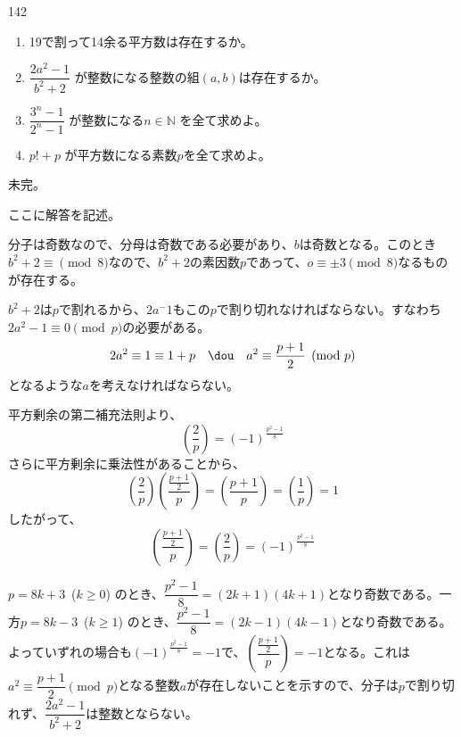 \begin{prob}{142}{}{}
 \begin{enumerate}
  \item 19で割って14余る平方数は存在するか。 
  \item $\dfrac{2a^2-1}{b^2+2}$ が整数になる整数の組$(a,b)$は存在するか。 
  \item $\dfrac{3^n-1}{2^n-1}$ が整数になる$n\in\mathbb{N}$ を全て求めよ。 
  \item $p!+p$ が平方数になる素数$p$を全て求めよ。 
 \end{enumerate}
\end{prob}
未完。

ここに解答を記述。

分子は奇数なので、分母は奇数である必要があり、$b$は奇数となる。このとき$b^2+2\equiv\pmod{8}$なので、$b^2+2$の素因数$p$であって、$o\equiv\pm 3 \pmod{8}$なるものが存在する。

$b^2+2$は$p$で割れるから、$2a^-1$もこの$p$で割り切れなければならない。すなわち$2a^2-1\equiv 0\pmod{p}$の必要がある。
\[ 2a^2\equiv 1\equiv 1+p \quad\dou\quad a^2\equiv \frac{p+1}{2} \pmod{p} \]
となるような$a$を考えなければならない。

平方剰余の第二補充法則より、
\[ \left(\frac{2}{p}\right)=\left(-1\right)^{\frac{p^2-1}{8}} \]
さらに平方剰余に乗法性があることから、
\[ \left(\frac{2}{p}\right)\left(\frac{\frac{p+1}{2}}{p}\right)=\left(\frac{p+1}{p}\right)=\left(\frac{1}{p}\right)=1 \]
したがって、
\[ \left(\frac{\frac{p+1}{2}}{p}\right)=\left(\frac{2}{p}\right)=\left(-1\right)^{\frac{p^2-1}{8}} \]

$p=8k+3$~($k\ge 0$) のとき、$\dfrac{p^2-1}{8}=(2k+1)(4k+1)$となり奇数である。一方$p=8k-3$~($k\ge 1$) のとき、$\dfrac{p^2-1}{8}=(2k-1)(4k-1)$となり奇数である。よっていずれの場合も$\left(-1\right)^\frac{p^2-1}{8}=-1$で、$\left(\dfrac{\frac{p+1}{2}}{p}\right)=-1$となる。これは$a^2\equiv \dfrac{p+1}{2} \pmod{p}$となる整数$a$が存在しないことを示すので、分子は$p$で割り切れず、$\dfrac{2a^2-1}{b^2+2}$は整数とならない。

